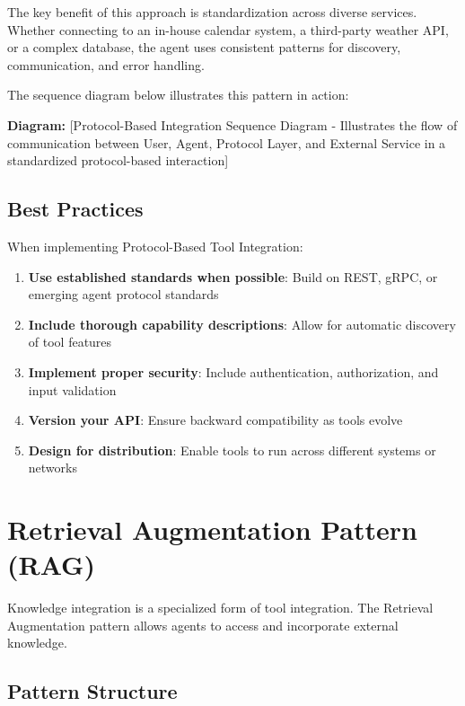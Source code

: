 \documentclass[11pt,oneside]{book}
\providecommand{\tightlist}{%
  \setlength{\itemsep}{0pt}\setlength{\parskip}{0pt}}
\begin{document}
The key benefit of this approach is standardization across diverse
services. Whether connecting to an in-house calendar system, a
third-party weather API, or a complex database, the agent uses
consistent patterns for discovery, communication, and error handling.

The sequence diagram below illustrates this pattern in action:

\textbf{Diagram:} {[}Protocol-Based Integration Sequence Diagram -
Illustrates the flow of communication between User, Agent, Protocol
Layer, and External Service in a standardized protocol-based
interaction{]}

\subsection{Best Practices}\label{best-practices-2}

When implementing Protocol-Based Tool Integration:

\begin{enumerate}
\def\labelenumi{\arabic{enumi}.}
\tightlist
\item
  \textbf{Use established standards when possible}: Build on REST, gRPC,
  or emerging agent protocol standards
\item
  \textbf{Include thorough capability descriptions}: Allow for automatic
  discovery of tool features
\item
  \textbf{Implement proper security}: Include authentication,
  authorization, and input validation
\item
  \textbf{Version your API}: Ensure backward compatibility as tools
  evolve
\item
  \textbf{Design for distribution}: Enable tools to run across different
  systems or networks
\end{enumerate}

\section{Retrieval Augmentation Pattern
(RAG)}\label{retrieval-augmentation-pattern-rag}

Knowledge integration is a specialized form of tool integration. The
Retrieval Augmentation pattern allows agents to access and incorporate
external knowledge.

\subsection{Pattern Structure}\label{pattern-structure-3}
\end{document}
